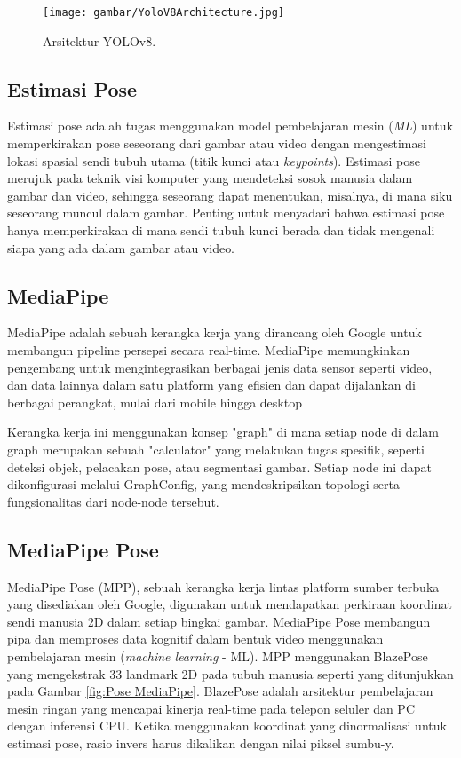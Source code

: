 \begin{figure}[H]
  \centering

  \texttt{[image: gambar/YoloV8Architecture.jpg]}

  \caption{Arsitektur YOLOv8.}
  \label{fig:Arsitektur Yolov8}
\end{figure}


\subsection{Estimasi Pose}
Estimasi pose adalah tugas menggunakan model pembelajaran mesin (\emph{ML}) untuk memperkirakan pose seseorang dari gambar atau video dengan mengestimasi lokasi spasial sendi tubuh utama (titik kunci atau \emph{keypoints}). Estimasi pose merujuk pada teknik visi komputer yang mendeteksi sosok manusia dalam gambar dan video, sehingga seseorang dapat menentukan, misalnya, di mana siku seseorang muncul dalam gambar. Penting untuk menyadari bahwa estimasi pose hanya memperkirakan di mana sendi tubuh kunci berada dan tidak mengenali siapa yang ada dalam gambar atau video.\cite{tensorflow2015-whitepaper}

\subsection{MediaPipe}
MediaPipe adalah sebuah kerangka kerja yang dirancang oleh Google untuk membangun pipeline persepsi secara real-time. MediaPipe memungkinkan pengembang untuk mengintegrasikan berbagai jenis data sensor seperti video, dan data lainnya dalam satu platform yang efisien dan dapat dijalankan di berbagai perangkat, mulai dari mobile hingga desktop \cite{MediaPipe}

Kerangka kerja ini menggunakan konsep "graph" di mana setiap node di dalam graph merupakan sebuah "calculator" yang melakukan tugas spesifik, seperti deteksi objek, pelacakan pose, atau segmentasi gambar. Setiap node ini dapat dikonfigurasi melalui GraphConfig, yang mendeskripsikan topologi serta fungsionalitas dari node-node tersebut.

\subsection{MediaPipe Pose}
MediaPipe Pose (MPP), sebuah kerangka kerja lintas platform sumber terbuka yang disediakan oleh Google, digunakan untuk mendapatkan perkiraan koordinat sendi manusia 2D dalam setiap bingkai gambar. MediaPipe Pose membangun pipa dan memproses data kognitif dalam bentuk video menggunakan pembelajaran mesin (\emph{machine learning} - ML). MPP menggunakan BlazePose yang mengekstrak 33 landmark 2D pada tubuh manusia seperti yang ditunjukkan pada Gambar \ref{fig:Pose MediaPipe}. BlazePose adalah arsitektur pembelajaran mesin ringan yang mencapai kinerja real-time pada telepon seluler dan PC dengan inferensi CPU. Ketika menggunakan koordinat yang dinormalisasi untuk estimasi pose, rasio invers harus dikalikan dengan nilai piksel sumbu-y. \cite{MediapipePose}

